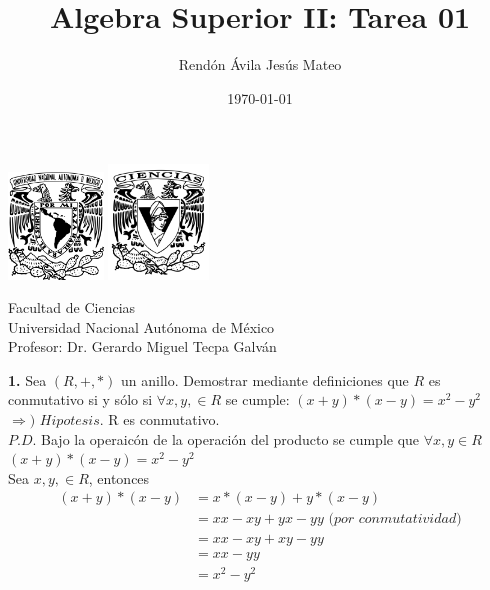 \documentclass[12pt]{article}
\title{\textbf{Algebra Superior II: Tarea 01}}
\author{Rendón Ávila Jesús Mateo}
\date{\today}
\begin{document}
\maketitle
\begin{center}
\vspace{2cm}
\includegraphics[width=0.19\textwidth]{Escudo.png}
\hspace{0.5cm}
\includegraphics[width=0.2\textwidth]{logo_ciencias.png}
\end{center}
\begin{center}
    \vspace{1cm}
    Facultad de Ciencias\\
    Universidad Nacional Autónoma de México\\
    \vspace{3cm}
    Profesor: Dr. Gerardo Miguel Tecpa Galván\\
\end{center}

\newpage

%
%
\textbf{1.} Sea $(R, +, \ast)$ un anillo. Demostrar mediante definiciones que $R$ es conmutativo si y sólo si
$\forall x, y, \in R$ se cumple: $(x + y) \ast (x - y) = x^2 - y^2$\\

$\Longrightarrow)$ $Hipotesis$. R es conmutativo.\\

$P.D$. Bajo la operaicón de la operación del producto se cumple que $\forall x, y \in R$ $(x + y) \ast (x - y) = x^2 - y^2$\\

Sea $x, y, \in R$, entonces\\

\begin{align*}
    (x + y) \ast (x - y) &= x \ast (x - y) + y \ast (x - y)\\
    &= xx -xy +yx -yy \textit{ (por conmutatividad)}\\
    &= xx -xy +xy -yy\\
    &= xx - yy\\
    &= x^2 -y^2\\
\end{align*} 
\end{document}
